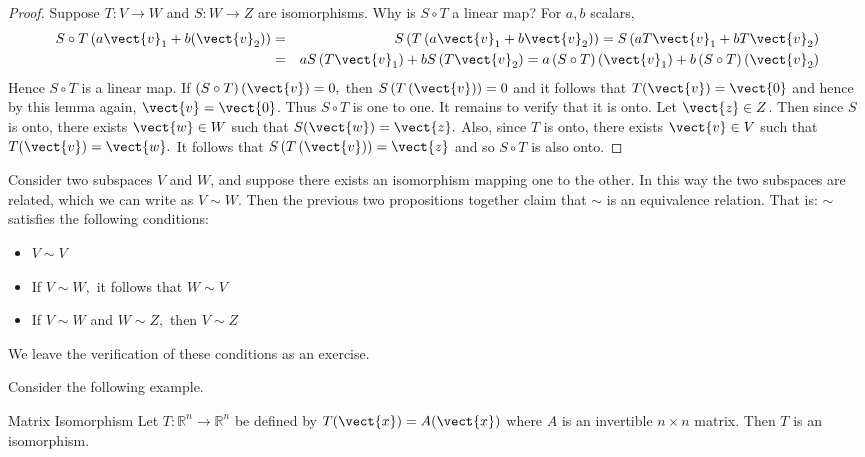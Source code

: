 \begin{proof}
Suppose $T:V\rightarrow W$ and  $S:W\rightarrow Z$ are isomorphisms. Why is $S\circ T$ a linear map?
For $a,b$ scalars,
\begin{eqnarray*}
S\circ T\left( a\vect{v}_{1}+b(\vect{v}_{2})\right) 
&=& S\left( T\left(a\vect{v}_{1}+b\vect{v}_{2}\right) \right) =S\left( aT\vect{v}_{1}+bT\vect{v}_{2}\right) \\
&=&aS\left( T\vect{v}_{1}\right) +bS\left( T\vect{v}_{2}\right) = a\left( S\circ
T\right) \left( \vect{v}_{1}\right) +b\left( S\circ T\right) \left( \vect{v}_{2}\right)
\end{eqnarray*}
Hence $S\circ T$ is a linear map. If $\left( S\circ T\right) \left( \vect{v} \right)
=0,$ then $S\left( T\left(  \vect{v} \right) \right) =0$ and it follows that $T(\vect{v})=\vect{0}$ and hence by this lemma again, $\vect{v}=\vect{0}$. Thus $S\circ
T $ is one to one. It remains to verify that it is onto. Let $\vect{z} \in Z$. Then
since $S$ is onto, there exists $\vect{w} \in W$ such that $S(\vect{w})=\vect{z}.$ Also, since $T$
is onto, there exists $\vect{v}\in V$ such that $T(\vect{v})=\vect{w}.$ It follows that $S\left(
T\left( \vect{v}\right) \right) =\vect{z}$ and so $S\circ T$ is also onto.
\end{proof}

Consider two subspaces $V$ and $W$, and suppose there exists an isomorphism mapping one to the other. In this way the two subspaces are related, which we can write as $V \sim W$. Then the previous two propositions together claim that $\sim $ is an equivalence relation. That is: $\sim $
satisfies the following conditions:

\begin{itemize}
\item $V\sim V$

\item If $V\sim W,$ it follows that $W\sim V$

\item If $V\sim W$ and $W\sim Z,$ then $V\sim Z$
\end{itemize}

We leave the verification of these conditions as an exercise.

Consider the following example. 

\begin{example}{Matrix Isomorphism}\label{exa:matrixisomorphism}
Let $T:\mathbb{R}^{n}\rightarrow \mathbb{R}^{n}$ be defined by $T(\vect{x}) = A(\vect{x})$ where $A$ is an invertible $n\times n$ matrix. Then $T$ is
an isomorphism.
\end{example}

